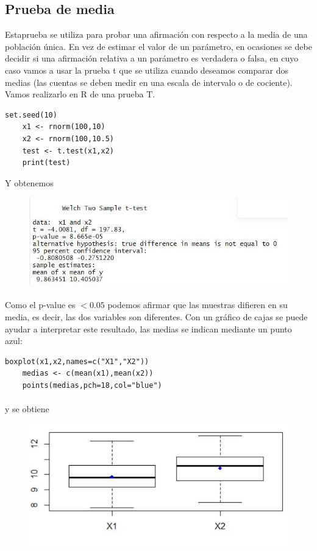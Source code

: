 \documentclass[12pt,hidelinks]{article}
\begin{document}
\subsection{Prueba de media}
Estaprueba se utiliza para probar una afirmación con respecto a la media de una población única. En vez de estimar el valor de un parámetro, en ocasiones se debe decidir si una afirmación relativa a un parámetro es verdadera o falsa, en cuyo caso vamos a usar la prueba t que se utiliza cuando deseamos comparar dos medias (las cuentas se deben medir en una escala de intervalo o de cociente). Vamos realizarlo en R de una prueba T.
\begin{lstlisting}[frame=single]
	set.seed(10)
	x1 <- rnorm(100,10) 
	x2 <- rnorm(100,10.5) 
	test <- t.test(x1,x2)
	print(test)
\end{lstlisting}
Y obtenemos
\begin{figure}[h!]
	\centering
	\includegraphics[scale=0.8]{images/3/t-s.JPG}
\end{figure}
\paragraph{}Como el p-value es $< 0.05$ podemos afirmar que las muestras difieren en su media, es decir, las dos variables son diferentes. Con un gráfico de cajas se puede ayudar a interpretar este resultado, las medias se indican mediante un punto azul:
\begin{lstlisting}[frame=single]
	boxplot(x1,x2,names=c("X1","X2"))
	medias <- c(mean(x1),mean(x2))
	points(medias,pch=18,col="blue")
\end{lstlisting}
\paragraph{}y se obtiene
\begin{figure}[t!]
	\centering
	\includegraphics[width=0.8\linewidth]{images/3/grafica-t.JPG}
\end{figure}
\end{document}
